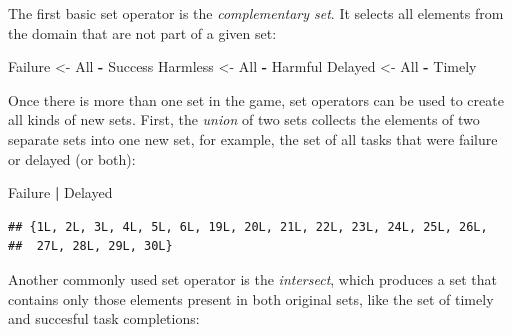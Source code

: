 \documentclass[]{svmono}
\newenvironment{Shaded}{\begin{snugshade}}{\end{snugshade}}
\newcommand{\KeywordTok}[1]{\textcolor[rgb]{0.13,0.29,0.53}{\textbf{#1}}}
\newcommand{\StringTok}[1]{\textcolor[rgb]{0.31,0.60,0.02}{#1}}
\newcommand{\OperatorTok}[1]{\textcolor[rgb]{0.81,0.36,0.00}{\textbf{#1}}}
\newcommand{\NormalTok}[1]{#1}
\begin{document}
\begin{Shaded}
\end{Shaded}

The first basic set operator is the \emph{complementary set}. It selects
all elements from the domain that are not part of a given set:

\begin{Shaded}
\begin{Highlighting}[]
\NormalTok{Failure  <-}\StringTok{ }\NormalTok{All }\OperatorTok{-}\StringTok{ }\NormalTok{Success}
\NormalTok{Harmless <-}\StringTok{ }\NormalTok{All }\OperatorTok{-}\StringTok{ }\NormalTok{Harmful}
\NormalTok{Delayed  <-}\StringTok{ }\NormalTok{All }\OperatorTok{-}\StringTok{ }\NormalTok{Timely}
\end{Highlighting}
\end{Shaded}

Once there is more than one set in the game, set operators can be used
to create all kinds of new sets. First, the \emph{union} of two sets
collects the elements of two separate sets into one new set, for
example, the set of all tasks that were failure or delayed (or both):

\begin{Shaded}
\begin{Highlighting}[]
\NormalTok{Failure }\OperatorTok{|}\StringTok{ }\NormalTok{Delayed}
\end{Highlighting}
\end{Shaded}

\begin{verbatim}
## {1L, 2L, 3L, 4L, 5L, 6L, 19L, 20L, 21L, 22L, 23L, 24L, 25L, 26L,
##  27L, 28L, 29L, 30L}
\end{verbatim}

Another commonly used set operator is the \emph{intersect}, which
produces a set that contains only those elements present in both
original sets, like the set of timely and succesful task completions:
\end{document}
